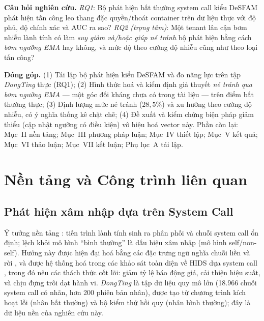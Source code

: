 \documentclass[conference,10pt]{IEEEtran}
\begin{document}
\textbf{Câu hỏi nghiên cứu.}
\textit{RQ1}: Bộ phát hiện bất thường system call kiểu DeSFAM phát hiện tấn công leo thang đặc quyền/thoát container trên dữ liệu thực với độ phủ, độ chính xác và AUC ra sao?
\textit{RQ2 (trọng tâm)}: Một tenant lân cận bơm nhiễu lành tính có làm \textit{suy giảm và/hoặc giúp né tránh} bộ phát hiện bằng cách \textit{bơm ngưỡng EMA} hay không, và mức độ theo cường độ nhiễu cũng như theo loại tấn công?

\textbf{Đóng góp.}
(1) Tái lập bộ phát hiện kiểu DeSFAM và đo năng lực trên tập \textit{DongTing} thực (RQ1);
(2) Hình thức hoá và kiểm định giả thuyết \textit{né tránh qua bơm ngưỡng EMA} — một góc đối kháng chưa có trong tài liệu — trên điểm bất thường thực;
(3) Định lượng mức né tránh ($28{,}5\%$) và xu hướng theo cường độ nhiễu, có ý nghĩa thống kê chặt chẽ;
(4) Đề xuất và kiểm chứng biện pháp giảm thiểu (cập nhật ngưỡng có điều kiện) vô hiệu hoá vector này.
Phần còn lại: Mục~II nền tảng; Mục~III phương pháp luận; Mục~IV thiết lập; Mục~V kết quả; Mục~VI thảo luận; Mục~VII kết luận; Phụ lục~A tái lập.

\section{Nền tảng và Công trình liên quan}

\subsection{Phát hiện xâm nhập dựa trên System Call}
Ý tưởng nền tảng \cite{forrest1996sense}: tiến trình lành tính sinh ra phân phối và chuỗi system call ổn định; lệch khỏi mô hình ``bình thường'' là dấu hiệu xâm nhập (mô hình self/non-self). Hướng này được hiện đại hoá bằng các đặc trưng ngữ nghĩa chuỗi liền và rời \cite{creech2014semantic}, và được hệ thống hoá trong các khảo sát toàn diện về HIDS dựa system call \cite{liu2018hids,bridges2019hostdata}, trong đó nêu các thách thức cốt lõi: giảm tỷ lệ báo động giả, cải thiện hiệu suất, và chịu đựng trôi dạt hành vi. \textit{DongTing} \cite{dongting2023} là tập dữ liệu quy mô lớn (18.966 chuỗi system call có nhãn, hơn 200 phiên bản nhân), được tạo từ chương trình kích hoạt lỗi (nhân bất thường) và bộ kiểm thử hồi quy (nhân bình thường); đây là dữ liệu nền của nghiên cứu này.
\end{document}
